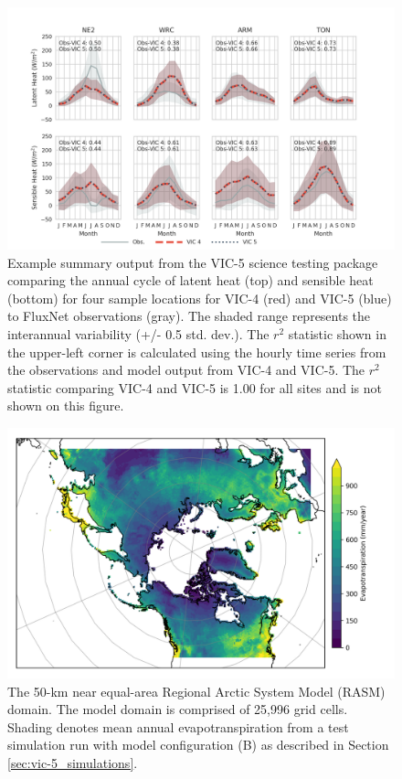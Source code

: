 \documentclass[gmd, manuscript]{copernicus}
\begin{document}
\clearpage
\begin{figure}[t]
\includegraphics[width=12cm]{VIC_science_tests_fluxes.png}
\caption{Example summary output from the VIC-5 science testing package comparing the annual cycle of latent heat (top) and sensible heat (bottom) for four sample locations for VIC-4 (red) and VIC-5 (blue) to FluxNet observations (gray). The shaded range represents the interannual variability (+/- 0.5 std. dev.). The $r^2$ statistic shown in the upper-left corner is calculated using the hourly time series from the observations and model output from VIC-4 and VIC-5. The $r^2$ statistic comparing VIC-4 and VIC-5 is 1.00 for all sites and is not shown on this figure.}
\label{fig:vic_fluxes}
\end{figure}

\clearpage
\begin{figure}[t]
\includegraphics[width=6in]{RASM_domain_fig.png}
\caption{The 50-km near equal-area Regional Arctic System Model (RASM) domain. The model domain is comprised of 25,996 grid cells. Shading denotes mean annual evapotranspiration from a test simulation run with model configuration (B) as described in Section \ref{sec:vic-5_simulations}.}
\label{fig:vic_domain}
\end{figure}
\end{document}
